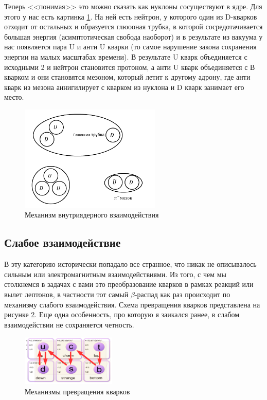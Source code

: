 \documentclass[12pt]{article}
\begin{document}
Теперь <<понимая>> это можно сказать как нуклоны сосуществуют в ядре. Для этого у нас есть картинка \ref{fig:sem_11_nuclei}. На ней есть нейтрон, у которого один из D-кварков отходит от остальных и образуется глюооная трубка, в которой сосредотачивается большая энергия (асимптотическая свобода наоборот) и в результате из вакуума у нас появляется пара U  и анти U кварки (то самое нарушение закона сохранения энергии на малых масштабах времени). В результате U кварк объединяется с исходными 2 и нейтрон становится протоном, а анти U кварк объединяется с В кварком и они становятся мезоном, который летит к другому адрону, где анти кварк из мезона аннигилирует с кварком из нуклона и D кварк занимает его место.

\begin{figure}[h]
    \centering
    \includegraphics[width=0.6\textwidth,height=\textheight,keepaspectratio]{Seminar_11/pics/pic_03_nuclei.pdf}
    \caption{Механизм внутриядерного взаимодействия}
    \label{fig:sem_11_nuclei}
\end{figure}

\subsection{Слабое взаимодействие}
В эту категорию исторически попадало все странное, что никак не описывалось сильным или электромагнитным взаимодействиями. Из того, с чем мы столкнемся в задачах с вами это преобразование кварков в рамках реакций или вылет лептонов, в частности тот самый $\beta$-распад как раз происходит по механизму слабого взаимодействия. Схема превращения кварков представлена на рисунке \ref{fig:sem_11_weak}. Еще одна особенность, про которую я заикался ранее, в слабом взаимодействии не сохраняется четность. 
\begin{figure}[h]
    \centering
    \includegraphics[width=0.4\textwidth,height=\textheight,keepaspectratio]{Seminar_11/pics/pic_04_weak.PNG}
    \caption{Механизмы превращения кварков}
    \label{fig:sem_11_weak}
\end{figure}
\end{document}
